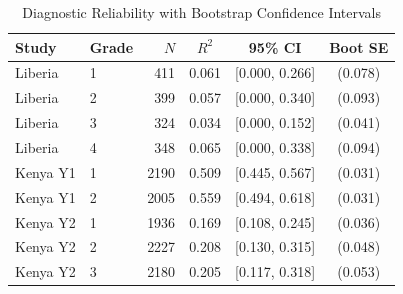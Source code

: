 \begin{table}[htbp]
\centering\small
\caption{Diagnostic Reliability with Bootstrap Confidence Intervals}
\label{tab:reliability_boot}
\begin{tabular}{llrccc}
\toprule
Study & Grade & $N$ & $R^2$ & 95\% CI & Boot SE \\
\midrule
Liberia & 1 & 411 & 0.061 & [0.000, 0.266] & (0.078) \\
Liberia & 2 & 399 & 0.057 & [0.000, 0.340] & (0.093) \\
Liberia & 3 & 324 & 0.034 & [0.000, 0.152] & (0.041) \\
Liberia & 4 & 348 & 0.065 & [0.000, 0.338] & (0.094) \\
Kenya Y1 & 1 & 2190 & 0.509 & [0.445, 0.567] & (0.031) \\
Kenya Y1 & 2 & 2005 & 0.559 & [0.494, 0.618] & (0.031) \\
Kenya Y2 & 1 & 1936 & 0.169 & [0.108, 0.245] & (0.036) \\
Kenya Y2 & 2 & 2227 & 0.208 & [0.130, 0.315] & (0.048) \\
Kenya Y2 & 3 & 2180 & 0.205 & [0.117, 0.318] & (0.053) \\
\bottomrule
\end{tabular}
\par\smallskip{}
\end{table}